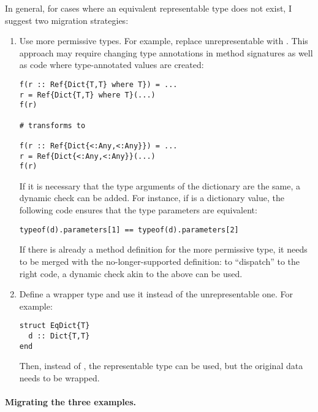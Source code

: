 In general, for cases where an equivalent representable type does not exist,
I suggest two migration strategies:
\begin{enumerate}
  \item Use more permissive types. For example, replace unrepresentable
     with .
    This approach may require changing type annotations in method signatures as
    well as code where type-annotated values are created:
    \begin{codeenvd}
    \begin{lstlisting}
f(r :: Ref{Dict{T,T} where T}) = ...
r = Ref{Dict{T,T} where T}(...)
f(r)

# transforms to

f(r :: Ref{Dict{<:Any,<:Any}}) = ...
r = Ref{Dict{<:Any,<:Any}}(...)
f(r)
    \end{lstlisting}
    \end{codeenvd}
    If it is necessary that the type arguments of the dictionary are the same,
    a dynamic check can be added. For instance, if  is a dictionary
    value, the following code ensures that the type parameters are
    equivalent:
    \begin{codeenvd}
    \begin{lstlisting}
typeof(d).parameters[1] == typeof(d).parameters[2]
    \end{lstlisting}
    \end{codeenvd}
    If there is already a method definition for the more permissive type,
    it needs to be merged with the no-longer-supported definition:
    to ``dispatch'' to the right code, a dynamic check akin to the above
    can be used.
  \item Define a wrapper type and use it instead of the unrepresentable one.
    For example:
    \begin{codeenvd}
    \begin{lstlisting}
struct EqDict{T}
  d :: Dict{T,T}
end
    \end{lstlisting}
    \end{codeenvd}
    Then, instead of , the representable type
     can be used, but the original data needs
    to be wrapped.
\end{enumerate}

\paragraph{Migrating the three examples.}

